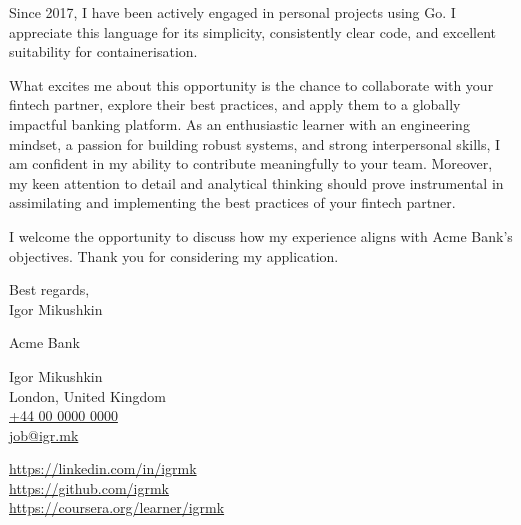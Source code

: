 \documentclass[9pt,a4paper]{juicv}
\makeatletter
\newcommand{\myphone}{\href{tel:+440000000000}{+44 00 0000 0000}}
\newcommand{\myemail}{\href{mailto:job@igr.mk}{job@igr.mk}}
\makeatother
\begin{document}
\begin{paracol}{2}
Since 2017, I have been actively engaged in personal projects using Go.
I appreciate this language for its simplicity, consistently clear code,
and excellent suitability for containerisation.

What excites me about this opportunity is the chance
to collaborate with your fintech partner, explore their best practices,
and apply them to a globally impactful banking platform.
As an enthusiastic learner with an engineering mindset,
a passion for building robust systems, and strong interpersonal skills,
I am confident in my ability to contribute meaningfully to your team.
Moreover, my keen attention to detail and analytical thinking should prove instrumental
in assimilating and implementing the best practices of your fintech partner.

I welcome the opportunity to discuss how my experience
aligns with Acme Bank's objectives.
Thank you for considering my application.

\vspace{12pt}

Best regards,\\
Igor Mikushkin

\newpage
\switchcolumn
\raggedright
\setlength{\parskip}{0em}

    Acme Bank

    Igor Mikushkin\\
    London, United Kingdom\\
    \myphone\\
    \myemail

    \vspace{6pt}
    {
        \small
        \href{https://linkedin.com/in/igrmk}{https://linkedin.com/in/igrmk}\\
        \href{https://github.com/igrmk}{https://github.com/igrmk}\\
        \href{https://coursera.org/learner/igrmk}{https://coursera.org/learner/igrmk}
        \par
    }

\end{paracol}
\end{document}
